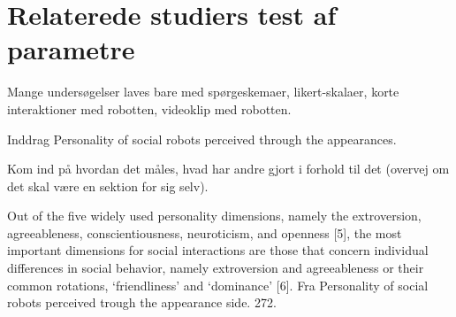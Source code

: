 \section{Relaterede studiers test af parametre}
\label{ParametreTidligereStudier}
Mange undersøgelser laves bare med spørgeskemaer, likert-skalaer, korte interaktioner med robotten, videoklip med robotten. 

\noindent Inddrag Personality of social robots perceived through the appearances.

\noindent Kom ind på hvordan det måles, hvad har andre gjort i forhold til det (overvej om det skal være en sektion for sig selv).\blankline


Out of the five widely used personality dimensions, namely the extroversion, agreeableness, conscientiousness, neuroticism, and openness [5], the most important dimensions for social interactions are those that concern individual differences in social behavior, namely extroversion and agreeableness or their common rotations, ‘friendliness’ and ‘dominance’ [6]. Fra Personality of social robots perceived trough the appearance side. 272.